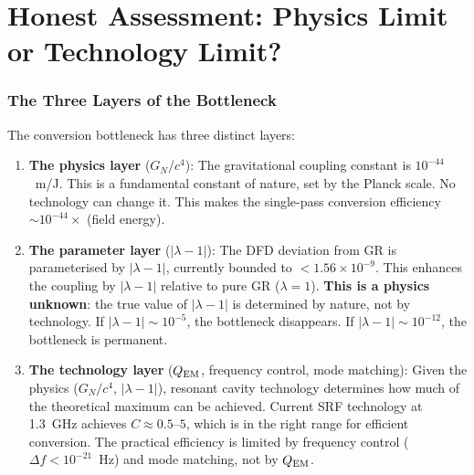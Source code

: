\documentclass[11pt]{article}
\newcommand{\ee}[1]{\times 10^{#1}}
\newcommand{\lambdaone}{|\lambda{-}1|}
\newcommand{\QEM}{Q_{\rm EM}}
\newcommand{\GN}{G_N}
\begin{document}
\part{Honest Assessment: Physics Limit or Technology Limit?}
\label{part:honest}

\section{The Three Layers of the Bottleneck}
\label{sec:three-layers}

The conversion bottleneck has three distinct layers:

\begin{enumerate}
\item \textbf{The physics layer} ($\GN/c^4$): The gravitational coupling
  constant is $10^{-44}$~m/J. This is a fundamental constant of nature,
  set by the Planck scale. No technology can change it. This makes the
  single-pass conversion efficiency $\sim 10^{-44} \times$ (field energy).

\item \textbf{The parameter layer} ($\lambdaone$): The DFD deviation
  from GR is parameterised by $|\lambda - 1|$, currently bounded to
  $< 1.56\ee{-9}$. This enhances the coupling by $\lambdaone$ relative
  to pure GR ($\lambda = 1$). \textbf{This is a physics unknown}: the
  true value of $\lambdaone$ is determined by nature, not by technology.
  If $\lambdaone \sim 10^{-5}$, the bottleneck disappears. If
  $\lambdaone \sim 10^{-12}$, the bottleneck is permanent.

\item \textbf{The technology layer} ($\QEM$, frequency control, mode
  matching): Given the physics ($\GN/c^4$, $\lambdaone$), resonant
  cavity technology determines how much of the theoretical maximum can
  be achieved. Current SRF technology at 1.3~GHz achieves $C \approx
  0.5$--$5$, which is in the right range for efficient conversion.
  The practical efficiency is limited by frequency control ($\Delta f
  < 10^{-21}$~Hz) and mode matching, not by $\QEM$.
\end{enumerate}
\end{document}
